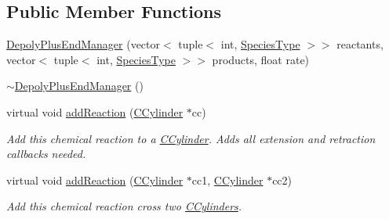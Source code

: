 \subsection*{Public Member Functions}
\begin{DoxyCompactItemize}
\item 
\hyperlink{classDepolyPlusEndManager_a928aca04c94403f31b60431c8b996847}{Depoly\+Plus\+End\+Manager} (vector$<$ tuple$<$ int, \hyperlink{Species_8h_a50651af47c56ea0e27235468d23542cf}{Species\+Type} $>$$>$ reactants, vector$<$ tuple$<$ int, \hyperlink{Species_8h_a50651af47c56ea0e27235468d23542cf}{Species\+Type} $>$$>$ products, float rate)
\item 
\hyperlink{classDepolyPlusEndManager_a262e63ed92a58c78205ac05b2b8fd1bf}{$\sim$\+Depoly\+Plus\+End\+Manager} ()
\item 
virtual void \hyperlink{classDepolyPlusEndManager_a2382f480f2ef9758533cd20cc0cfd0e5}{add\+Reaction} (\hyperlink{classCCylinder}{C\+Cylinder} $\ast$cc)
\begin{DoxyCompactList}\small\item\em Add this chemical reaction to a \hyperlink{classCCylinder}{C\+Cylinder}. Adds all extension and retraction callbacks needed. \end{DoxyCompactList}\item 
virtual void \hyperlink{classDepolyPlusEndManager_af3f3348ebf1d614dc9b1fcfe8282201f}{add\+Reaction} (\hyperlink{classCCylinder}{C\+Cylinder} $\ast$cc1, \hyperlink{classCCylinder}{C\+Cylinder} $\ast$cc2)
\begin{DoxyCompactList}\small\item\em Add this chemical reaction cross two \hyperlink{classCCylinder}{C\+Cylinders}. \end{DoxyCompactList}\end{DoxyCompactItemize}

